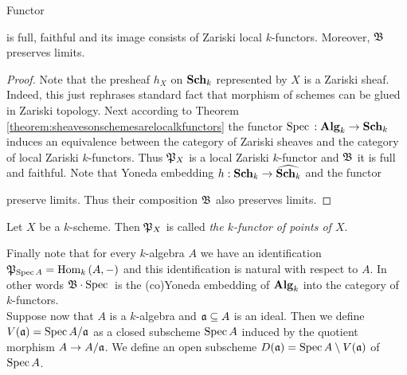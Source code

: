 \begin{fact}\label{fact:functorsofpoints}
Functor
\begin{center}
\end{center}
is full, faithful and its image consists of Zariski local $k$-functors. Moreover, ${\mathfrak B}$ preserves limits.
\end{fact}
\begin{proof}
Note that the presheaf $h_X$ on $\mathbf{Sch}_k$ represented by $X$ is a Zariski sheaf. Indeed, this just rephrases standard fact that morphism of schemes can be glued in Zariski topology. Next according to Theorem \ref{theorem:sheavesonschemesarelocalkfunctors} the functor $\mathrm{Spec}\,:\mathbf{Alg}_k\rightarrow \mathbf{Sch}_k$ induces an equivalence between the category of Zariski sheaves and the category of local Zariski $k$-functors. Thus ${\mathfrak P}_X$ is a local Zariski $k$-functor and ${\mathfrak B}$ it is full and faithful. Note that Yoneda embedding $h:\mathbf{Sch}_k\rightarrow \widehat{\mathbf{Sch}_k}$ and the functor
\begin{center}
\end{center}
preserve limits. Thus their composition ${\mathfrak B}$ also preserves limits.
\end{proof}

\begin{definition}
Let $X$ be a $k$-scheme. Then ${\mathfrak P}_X$ is called \textit{the $k$-functor of points of $X$}.
\end{definition}
\noindent
Finally note that for every $k$-algebra $A$ we have an identification ${\mathfrak P}_{\mathrm{Spec}\, A} = \mathrm{Hom}_k\left(A,-\right)$ and this identification is natural with respect to $A$. In other words ${\mathfrak B}\cdot \mathrm{Spec}\,$ is the (co)Yoneda embedding of $\mathbf{Alg}_k$ into the category of $k$-functors.\\
Suppose now that $A$ is a $k$-algebra and $\mathfrak{a}\subseteq A$ is an ideal. Then we define $V(\mathfrak{a}) = \mathrm{Spec}\, A/\mathfrak{a}$ as a closed subscheme $\mathrm{Spec}\, A$ induced by the quotient morphism $A\rightarrow A/\mathfrak{a}$. We define an open subscheme $D(\mathfrak{a}) = \mathrm{Spec}\, A\setminus V(\mathfrak{a})$ of $\mathrm{Spec}\, A$.

